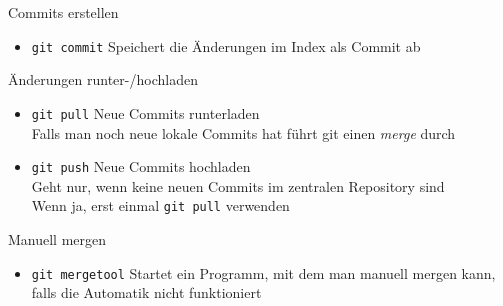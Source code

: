 \begin{frame}{Commits erstellen}
  \begin{itemize}
    \item \texttt{git commit} Speichert die Änderungen im Index als Commit ab
  \end{itemize}
\end{frame}

\begin{frame}{Änderungen runter-/hochladen}
  \begin{itemize}
    \item \texttt{git pull} Neue Commits runterladen\\
                            Falls man noch neue lokale Commits hat führt git einen \textit{merge} durch
    \item \texttt{git push} Neue Commits hochladen\\
                            Geht nur, wenn keine neuen Commits im zentralen Repository sind\\
                            Wenn ja, erst einmal \texttt{git pull} verwenden
  \end{itemize}
\end{frame}

\begin{frame}{Manuell mergen}
  \begin{itemize}
    \item \texttt{git mergetool} Startet ein Programm, mit dem man manuell mergen kann, falls die Automatik nicht funktioniert
  \end{itemize}
\end{frame}
